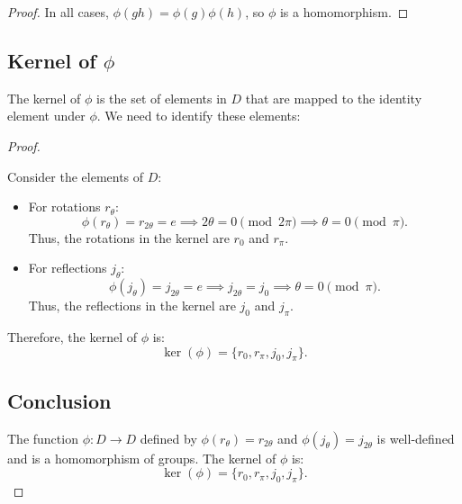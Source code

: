 \documentclass[12pt]{amsart}
\theoremstyle{definition}
\numberwithin{equation}{section}
\begin{document}
\begin{exercise}{3}
\begin{proof}
In all cases, \(\phi(gh) = \phi(g) \phi(h)\), so \(\phi\) is a homomorphism.

\end{proof}

\subsection*{Kernel of \(\phi\)}

The kernel of \(\phi\) is the set of elements in \(D\) that are mapped to the identity element under \(\phi\). We need to identify these elements:

\begin{proof} \( \)

Consider the elements of \(D\):
\begin{itemize}
    \item For rotations \(r_\theta\):
    \[
    \phi(r_\theta) = r_{2\theta} = e \implies 2\theta = 0 \pmod{2\pi} \implies \theta = 0 \pmod{\pi}.
    \]
    Thus, the rotations in the kernel are \(r_0\) and \(r_\pi\).
    \item For reflections \(j_\theta\):
    \[
    \phi(j_\theta) = j_{2\theta} = e \implies j_{2\theta} = j_0 \implies \theta = 0 \pmod{\pi}.
    \]
    Thus, the reflections in the kernel are \(j_0\) and \(j_\pi\).
\end{itemize}

Therefore, the kernel of \(\phi\) is:
\[
\ker(\phi) = \{r_0, r_\pi, j_0, j_\pi\}.
\]


\subsection*{Conclusion}

The function \(\phi: D \rightarrow D\) defined by \(\phi(r_\theta) = r_{2\theta}\) and \(\phi(j_\theta) = j_{2\theta}\) is well-defined and is a homomorphism of groups. The kernel of \(\phi\) is:
\[
    \ker(\phi) = \{r_0, r_\pi, j_0, j_\pi\}.
    \]
    
\end{proof}
\end{exercise}
\newpage
    
\end{document}
